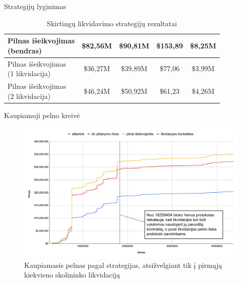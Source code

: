 \documentclass[12pt]{beamer}
\begin{document}
\begin{frame}{Strategijų lyginimas}
\begin{table}[h!]
\begin{tabular}{|l|c|c|c|c|}
        \makecell[cl]{Pilnas išeikvojimas \\ (bendras)}                   & 
        \$82,56M       & \$90,81M            & \$153,89         & \$8,25M                      \\ \hline
        \makecell[cl]{Pilnas išeikvojimas \\ (1 likvidacija)}                         & \$36,27M       & \$39,89M            & \$77,06            & \$3,99M                      \\ \hline
        \makecell[cl]{Pilnas išeikvojimas \\ (2 likvidacija)}                        & \$46,24M       & \$50,92M            & \$61,23            & \$4,26M                      \\ \hline
        \end{tabular}
        \caption{Skirtingų likvidavimo strategijų rezultatai}
    \end{table}
\end{frame}

\begin{frame}{Kaupiamoji pelno kreivė}
    \begin{figure}[H]
        \centering
        \includegraphics[scale=0.3]{resources/bendras4.png}
        \caption{Kaupiamasis pelnas pagal strategijas, atsižvelgiant tik į pirmąją kiekvieno skolininko likvidaciją}
        \label{img:bendras2}
      \end{figure}
\end{frame}
\end{document}
